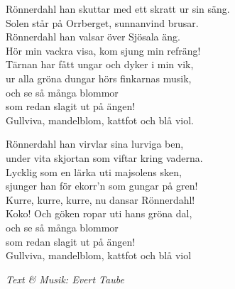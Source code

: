 \vspace{10pt}
Rönnerdahl han skuttar med ett skratt ur sin säng.\\
Solen står på Orrberget, sunnanvind brusar.\\
Rönnerdahl han valsar över Sjösala äng.\\
Hör min vackra visa, kom sjung min refräng!\\
Tärnan har fått ungar och dyker i min vik,\\
ur alla gröna dungar hörs finkarnas musik,\\
och se så många blommor\\
som redan slagit ut på ängen!\\
Gullviva, mandelblom, kattfot och blå viol.\par
\vspace{10pt}
Rönnerdahl han virvlar sina lurviga ben,\\
under vita skjortan som viftar kring vaderna.\\
Lycklig som en lärka uti majsolens sken,\\
sjunger han för ekorr'n som gungar på gren!\\
Kurre, kurre, kurre, nu dansar Rönnerdahl!\\
Koko! Och göken ropar uti hans gröna dal,\\
och se så många blommor\\
som redan slagit ut på ängen!\\
Gullviva, mandelblom, kattfot och blå viol
\par
\vspace{10pt}
{\footnotesize\textit{Text \& Musik: Evert Taube}}
